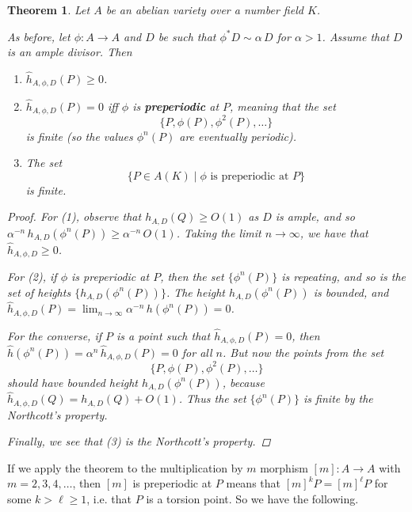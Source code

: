 \documentclass{article}
\newtheorem{theorem}[proposition]{Theorem}
\theoremstyle{definition}
\newcommand{\term}{\textbf}
\begin{document}
\begin{theorem}
  Let $A$ be an abelian variety over a number field $K$.

  As before, let $\phi\colon A\to A$ and $D$ be such that
  $\phi^* D \sim \alpha\,D$ for $\alpha > 1$. Assume that $D$ is an ample
  divisor. Then
  \begin{enumerate}
  \item[(1)] $\widehat{h}_{A,\phi,D} (P) \ge 0$.

  \item[(2)] $\widehat{h}_{A,\phi,D} (P) = 0$ iff $\phi$ is \term{preperiodic}
    at $P$, meaning that the set
    $$\{ P, \phi (P), \phi^2 (P),\ldots \}$$
    is finite (so the values $\phi^n (P)$ are eventually periodic).

  \item[(3)] The set
    $$\{ P \in A (K) \mid \phi \text{ is preperiodic at } P \}$$
    is finite.
  \end{enumerate}

  \begin{proof}
    For (1), observe that $h_{A,D} (Q) \ge O (1)$ as $D$ is ample, and so
    $\alpha^{-n}\,h_{A,D} (\phi^n (P)) \ge \alpha^{-n}\,O(1)$. Taking the limit
    $n\to\infty$, we have that $\widehat{h}_{A,\phi,D} \ge 0$.

    For (2), if $\phi$ is preperiodic at $P$, then the set $\{ \phi^n (P) \}$ is
    repeating, and so is the set of heights $\{ h_{A,D} (\phi^n (P)) \}$.
    The height $h_{A,D} (\phi^n (P))$ is bounded, and
    $\widehat{h}_{A,\phi,D} (P) = \lim_{n\to\infty} \alpha^{-n} \, h (\phi^n
    (P)) = 0$.

    For the converse, if $P$ is a point such that
    $\widehat{h}_{A,\phi,D} (P) = 0$, then
    $\widehat{h} (\phi^n (P)) = \alpha^n \, \widehat{h}_{A,\phi,D} (P) = 0$ for
    all $n$. But now the points from the set
    $$\{ P, \phi (P), \phi^2 (P), \ldots \}$$
    should have bounded height $h_{A,D} (\phi^n (P))$, because
    $\widehat{h}_{A,\phi,D} (Q) = h_{A,D} (Q) + O (1)$. Thus the set
    $\{ \phi^n (P) \}$ is finite by the Northcott's property.

    Finally, we see that (3) is the Northcott's property.
  \end{proof}
\end{theorem}

If we apply the theorem to the multiplication by $m$ morphism $[m]\colon A\to A$
with $m = 2,3,4,\ldots$, then $[m]$ is preperiodic at $P$ means that
$[m]^k P = [m]^\ell P$ for some $k > \ell \ge 1$, i.e. that $P$ is a torsion
point. So we have the following.
\end{document}
